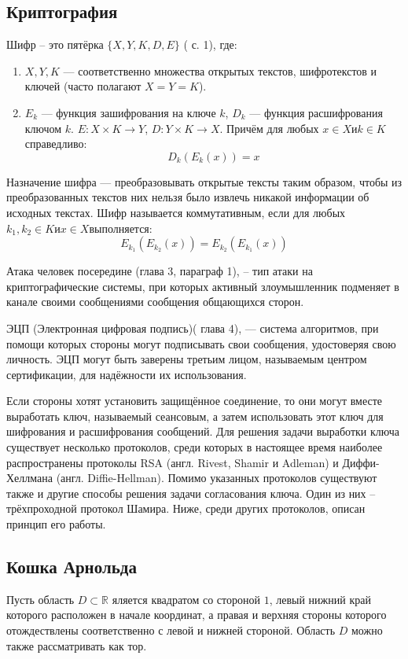 \subsection{Криптография}
Шифр – это пятёрка $\{X, Y, K, D, E\}$ \autocite{Drs}( с. 1), где:
\begin{enumerate}
	\item $X, Y, K$ --- соответственно множества открытых текстов, шифротекстов и ключей (часто полагают $X = Y = K$).\\
	\item $E_{k}$ --- функция зашифрования на ключе $k$, $D_{k}$ --- функция расшифрования ключом $k$. $E : X \times K \rightarrow Y$, $D : Y \times K \rightarrow X$. Причём для любых $x \in X и k \in K$справедливо:
	$$D_{k}(E_{k}(x)) = x$$
\end{enumerate}

Назначение шифра --- преобразовывать открытые тексты таким образом, чтобы из преобразованных текстов них нельзя было извлечь никакой информации об исходных текстах. 
Шифр называется коммутативным, если для любых $k_{1},k_{2}\in K и x  \in X$выполняется:
		$$E_{k_{1}}(E_{k_{2}}(x)) = E_{k_{2}}(E_{k_{1}}(x))$$
		
Атака человек посередине \autocite{Shnayer}(глава 3, параграф 1), – тип атаки на криптографические системы, при которых активный злоумышленник подменяет в канале своими сообщениями сообщения общающихся сторон.

ЭЦП (Электронная цифровая подпись)\autocite{Shnayer}( глава 4), --- система алгоритмов, при помощи которых стороны могут подписывать свои сообщения, удостоверяя свою личность. ЭЦП могут быть заверены третьим лицом, называемым центром сертификации, для надёжности их использования.

Если стороны хотят установить защищённое соединение, то они могут вместе выработать ключ, называемый сеансовым, а затем использовать этот ключ для шифрования и расшифрования сообщений. Для решения задачи выработки ключа существует несколько протоколов, среди которых в настоящее время наиболее распространены протоколы RSA (англ. Rivest, Shamir и Adleman) и Диффи-Хеллмана (англ. Diffie-Hellman). 
Помимо указанных протоколов существуют также и другие способы решения задачи согласования ключа. Один из них – трёхпроходной протокол Шамира. Ниже, среди других протоколов, описан принцип его работы.
\subsection{Кошка Арнольда}
Пусть область $D\subset \mathbb{R}$ яляется квадратом со стороной $1$, левый нижний край которого расположен в начале координат, а правая и верхняя стороны которого отождествлены соответственно с левой и нижней стороной. Область $D$ можно  также рассматривать как тор.

